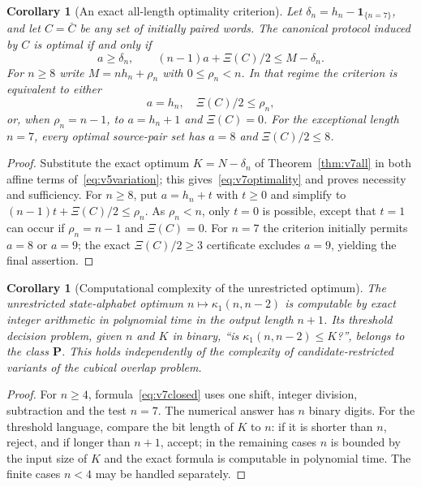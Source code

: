 \documentclass[11pt,a4paper]{article}
\newtheorem{corollary}[theorem]{Corollary}
\begin{document}
\begin{corollary}[An exact all-length optimality criterion]\label{cor:v7classification}
Let $\delta_n=h_n-\mathbf1_{\{n=7\}}$, and let $C=\bar C$ be any set of initially paired words. The canonical protocol induced by $C$ is optimal if and only if
\begin{equation}\label{eq:v7optimality}
 \boxed{\quad a\ge\delta_n,\qquad (n-1)a+\Xi(C)/2\le M-\delta_n.\quad}
\end{equation}
For $n\ge8$ write $M=nh_n+\rho_n$ with $0\le\rho_n<n$. In that regime the criterion is equivalent to either
\[
 a=h_n,\quad\Xi(C)/2\le\rho_n,
\]
or, when $\rho_n=n-1$, to $a=h_n+1$ and $\Xi(C)=0$. For the exceptional length $n=7$, every optimal source-pair set has $a=8$ and $\Xi(C)/2\le8$.
\end{corollary}
\begin{proof}
Substitute the exact optimum $K=N-\delta_n$ of Theorem~\ref{thm:v7all} in both affine terms of~\eqref{eq:v5variation}; this gives~\eqref{eq:v7optimality} and proves necessity and sufficiency. For $n\ge8$, put $a=h_n+t$ with $t\ge0$ and simplify to $(n-1)t+\Xi(C)/2\le\rho_n$. As $\rho_n<n$, only $t=0$ is possible, except that $t=1$ can occur if $\rho_n=n-1$ and $\Xi(C)=0$. For $n=7$ the criterion initially permits $a=8$ or $a=9$; the exact $\Xi(C)/2\ge3$ certificate excludes $a=9$, yielding the final assertion.
\end{proof}

\begin{corollary}[Computational complexity of the unrestricted optimum]\label{cor:v7complexity}
The unrestricted state-alphabet optimum $n\mapsto\kappa_1(n,n-2)$ is computable by exact integer arithmetic in polynomial time in the output length $n+1$. Its threshold decision problem, given $n$ and $K$ in binary, ``is $\kappa_1(n,n-2)\le K$?'', belongs to the class $\mathbf P$. This holds independently of the complexity of candidate-restricted variants of the cubical overlap problem.
\end{corollary}
\begin{proof}
For $n\ge4$, formula~\eqref{eq:v7closed} uses one shift, integer division, subtraction and the test $n=7$. The numerical answer has $n$ binary digits. For the threshold language, compare the bit length of $K$ to $n$: if it is shorter than $n$, reject, and if longer than $n+1$, accept; in the remaining cases $n$ is bounded by the input size of $K$ and the exact formula is computable in polynomial time. The finite cases $n<4$ may be handled separately.
\end{proof}
\end{document}
